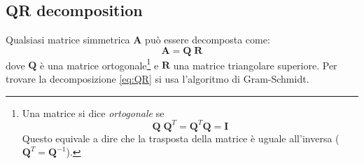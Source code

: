 \documentclass[10pt]{article}
\begin{document}
\subsection{QR decomposition}

Qualsiasi matrice simmetrica $\mathbf{A}$ può essere decomposta come:
\begin{equation}
\mathbf{A} = \mathbf{Q} \; \mathbf{R}
\label{eq:QR}
\end{equation}
dove $\mathbf{Q}$ è una matrice ortogonale\footnote{Una matrice si dice \emph{ortogonale} se
\begin{equation}
\mathbf{Q}\;\mathbf{Q}^T = \mathbf{Q}^T\mathbf{Q} = \mathbf{I}
\end{equation}
Questo equivale a dire che la trasposta della matrice è uguale all'inversa ($\mathbf{Q}^T=\mathbf{Q}^{-1}$).} e $\mathbf{R}$ una matrice triangolare superiore.
Per trovare la decomposizione \eqref{eq:QR} si usa l'algoritmo di Gram-Schmidt.
\end{document}
